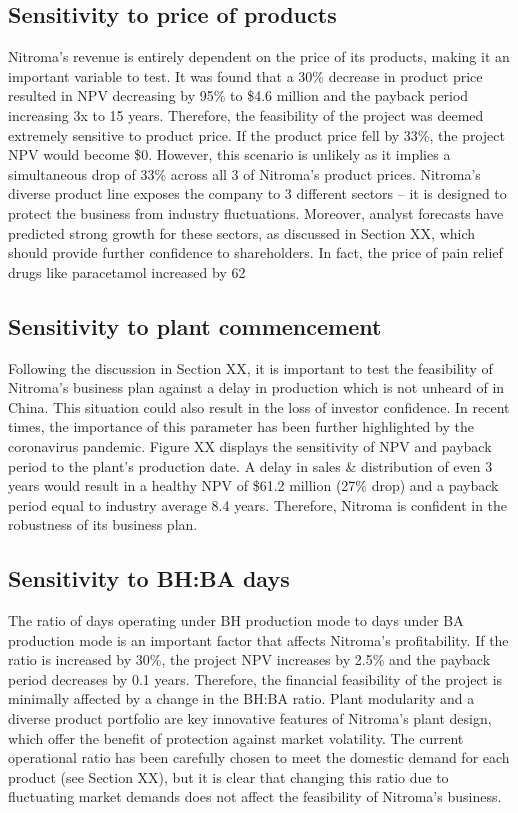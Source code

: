 \subsection{Sensitivity to price of products}
Nitroma’s revenue is entirely dependent on the price of its products, making it an important variable to test. It was found that a 30\% decrease in product price resulted in NPV decreasing by 95\% to \$4.6 million and the payback period increasing 3x to 15 years. Therefore, the feasibility of the project was deemed extremely sensitive to product price.  If the product price fell by 33\%, the project NPV would become \$0. However, this scenario is unlikely as it implies a simultaneous drop of 33\% across all 3 of Nitroma’s product prices. Nitroma’s diverse product line exposes the company to 3 different sectors – it is designed to protect the business from industry fluctuations. Moreover, analyst forecasts have predicted strong growth for these sectors, as discussed in Section XX, which should provide further confidence to shareholders. In fact, the price of pain relief drugs like paracetamol increased by 62%

\subsection{Sensitivity to plant commencement}
Following the discussion in Section XX, it is important to test the feasibility of Nitroma’s business plan against a delay in production which is not unheard of in China.  This situation could also result in the loss of investor confidence. In recent times, the importance of this parameter has been further highlighted by the coronavirus pandemic. Figure XX displays the sensitivity of NPV and payback period to the plant’s production date. A delay in sales & distribution of even 3 years would result in a healthy NPV of \$61.2 million (27\% drop) and a payback period equal to industry average 8.4 years. Therefore, Nitroma is confident in the robustness of its business plan.

\subsection{Sensitivity to BH:BA days}
The ratio of days operating under BH production mode to days under BA production mode is an important factor that affects Nitroma’s profitability. If the ratio is increased by 30\%, the project NPV increases by 2.5\% and the payback period decreases by 0.1 years. Therefore, the financial feasibility of the project is minimally affected by a change in the BH:BA ratio. Plant modularity and a diverse product portfolio are key innovative features of Nitroma’s plant design, which offer the benefit of protection against market volatility. The current operational ratio has been carefully chosen to meet the domestic demand for each product (see Section XX), but it is clear that changing this ratio due to fluctuating market demands does not affect the feasibility of Nitroma’s business. 